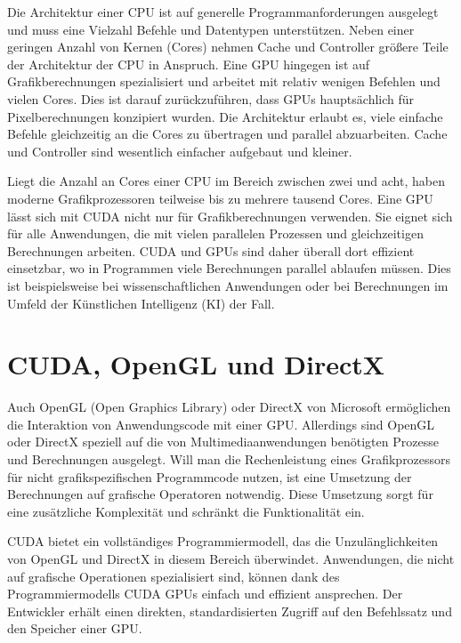 Die Architektur einer CPU ist auf generelle Programmanforderungen ausgelegt und muss eine Vielzahl Befehle und Datentypen unterstützen. Neben einer geringen Anzahl von Kernen (Cores) nehmen Cache und Controller größere Teile der Architektur der CPU in Anspruch. Eine GPU hingegen ist auf Grafikberechnungen spezialisiert und arbeitet mit relativ wenigen Befehlen und vielen Cores. Dies ist darauf zurückzuführen, dass GPUs hauptsächlich für Pixelberechnungen konzipiert wurden. Die Architektur erlaubt es, viele einfache Befehle gleichzeitig an die Cores zu übertragen und parallel abzuarbeiten. Cache und Controller sind wesentlich einfacher aufgebaut und kleiner. 

Liegt die Anzahl an Cores einer CPU im Bereich zwischen zwei und acht, haben moderne Grafikprozessoren teilweise bis zu mehrere tausend Cores. Eine GPU lässt sich mit CUDA nicht nur für Grafikberechnungen verwenden. Sie eignet sich für alle Anwendungen, die mit vielen parallelen Prozessen und gleichzeitigen Berechnungen arbeiten. CUDA und GPUs sind daher überall dort effizient einsetzbar, wo in Programmen viele Berechnungen parallel ablaufen müssen. Dies ist beispielsweise bei wissenschaftlichen Anwendungen oder bei Berechnungen im Umfeld der Künstlichen Intelligenz (KI) der Fall.



\section{CUDA, OpenGL und DirectX}

Auch OpenGL (Open Graphics Library) oder DirectX von Microsoft ermöglichen die Interaktion von Anwendungscode mit einer GPU. Allerdings sind OpenGL oder DirectX speziell auf die von Multimediaanwendungen benötigten Prozesse und Berechnungen ausgelegt. Will man die Rechenleistung eines Grafikprozessors für nicht grafikspezifischen Programmcode nutzen, ist eine Umsetzung der Berechnungen auf grafische Operatoren notwendig. Diese Umsetzung sorgt für eine zusätzliche Komplexität und schränkt die Funktionalität ein. 

CUDA bietet ein vollständiges Programmiermodell, das die Unzulänglichkeiten von OpenGL und DirectX in diesem Bereich überwindet. Anwendungen, die nicht auf grafische Operationen spezialisiert sind, können dank des Programmiermodells CUDA GPUs einfach und effizient ansprechen. Der Entwickler erhält einen direkten, standardisierten Zugriff auf den Befehlssatz und den Speicher einer GPU.


